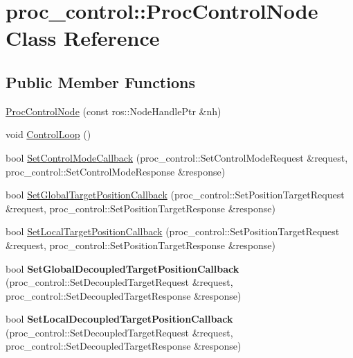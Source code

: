 \hypertarget{classproc__control_1_1_proc_control_node}{}\section{proc\+\_\+control\+:\+:Proc\+Control\+Node Class Reference}
\label{classproc__control_1_1_proc_control_node}
\subsection*{Public Member Functions}
\begin{DoxyCompactItemize}
\item 
\hyperlink{classproc__control_1_1_proc_control_node_a3990253ca2e924c15e25cecba4297359}{Proc\+Control\+Node} (const ros\+::\+Node\+Handle\+Ptr \&nh)
\item 
void \hyperlink{classproc__control_1_1_proc_control_node_adc8a2178d41c620f69cb74c2f09097cd}{Control\+Loop} ()
\item 
bool \hyperlink{classproc__control_1_1_proc_control_node_ac56aa1e6e028c225be157371aba76d32}{Set\+Control\+Mode\+Callback} (proc\+\_\+control\+::\+Set\+Control\+Mode\+Request \&request, proc\+\_\+control\+::\+Set\+Control\+Mode\+Response \&response)
\item 
bool \hyperlink{classproc__control_1_1_proc_control_node_a7890db7144358d5aaf0daa7bfefed964}{Set\+Global\+Target\+Position\+Callback} (proc\+\_\+control\+::\+Set\+Position\+Target\+Request \&request, proc\+\_\+control\+::\+Set\+Position\+Target\+Response \&response)
\item 
bool \hyperlink{classproc__control_1_1_proc_control_node_ad331887883a3c1c44472d72dfced3db6}{Set\+Local\+Target\+Position\+Callback} (proc\+\_\+control\+::\+Set\+Position\+Target\+Request \&request, proc\+\_\+control\+::\+Set\+Position\+Target\+Response \&response)
\item 
\mbox{\label{classproc__control_1_1_proc_control_node_a841b03177a02e542bf7f7aa8403c5382}} 
bool {\bfseries Set\+Global\+Decoupled\+Target\+Position\+Callback} (proc\+\_\+control\+::\+Set\+Decoupled\+Target\+Request \&request, proc\+\_\+control\+::\+Set\+Decoupled\+Target\+Response \&response)
\item 
\mbox{\label{classproc__control_1_1_proc_control_node_a01301ec4fcd9e4d149994cbe27ff8ca1}} 
bool {\bfseries Set\+Local\+Decoupled\+Target\+Position\+Callback} (proc\+\_\+control\+::\+Set\+Decoupled\+Target\+Request \&request, proc\+\_\+control\+::\+Set\+Decoupled\+Target\+Response \&response)
\end{DoxyCompactItemize}
